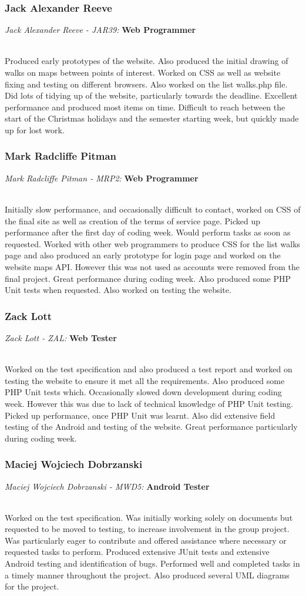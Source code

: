 \documentclass[12pt]{article}
\begin{document}
\subsubsection{Jack Alexander Reeve}
\centerline{\emph{Jack Alexander Reeve
 - JAR39:}\textbf{ Web Programmer}}
~\\
Produced early prototypes of the website. Also produced the initial drawing of walks on maps between points of interest. Worked on CSS as well as website fixing and testing on different browsers. Also worked on the list walks.php file. Did lots of tidying up of the website, particularly towards the deadline. Excellent performance and produced most items on time. Difficult to reach between the start of the Christmas holidays and the semester starting week, but quickly made up for lost work.
\subsubsection{Mark Radcliffe Pitman}
\centerline{\emph{Mark Radcliffe Pitman - MRP2:}\textbf{ Web Programmer}}
~\\
Initially slow performance, and occasionally difficult to contact, worked on CSS of the final site as well as creation of the terms of service page. Picked up performance after the first day of coding week. Would perform tasks as soon as requested. Worked with other web programmers to produce CSS for the list walks page and also produced an early prototype for login page and worked on the website maps API. However this was not used as accounts were removed from the final project. Great performance during coding week. Also produced some PHP Unit tests when requested. Also worked on testing the website.
\subsubsection{Zack Lott}
\centerline{\emph{Zack Lott - ZAL:}\textbf{ Web Tester}}
~\\
Worked on the test specification and also produced a test report and worked on testing the website to ensure it met all the requirements. Also produced some PHP Unit tests which. Occasionally slowed down development during coding week. However this was due to lack of technical knowledge of PHP Unit testing. Picked up performance, once PHP Unit was learnt. Also did extensive field testing of the Android and testing of the website. Great performance particularly during coding week.
\subsubsection{Maciej Wojciech Dobrzanski}
\centerline{\emph{Maciej Wojciech Dobrzanski - MWD5:}\textbf{ Android Tester}}
~\\
Worked on the test specification. Was initially working solely on documents but requested to be moved to testing, to increase involvement in the group project. Was particularly eager to contribute and offered assistance where necessary or requested tasks to perform. Produced extensive JUnit tests and extensive Android testing and identification of bugs. Performed well and completed tasks in a timely manner throughout the project. Also produced several UML diagrams for the project. 
\newpage
\end{document}
